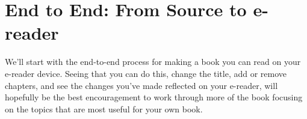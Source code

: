 
\chapter{End to End: From Source to e-reader}

We'll start with the end-to-end process for making a book you can read
on your e-reader device. Seeing that you can do this, change the title,
add or remove chapters, and see the changes you've made reflected on your 
e-reader, will hopefully be the best encouragement to work through more
of the book focusing on the topics that are most useful for your own book.


